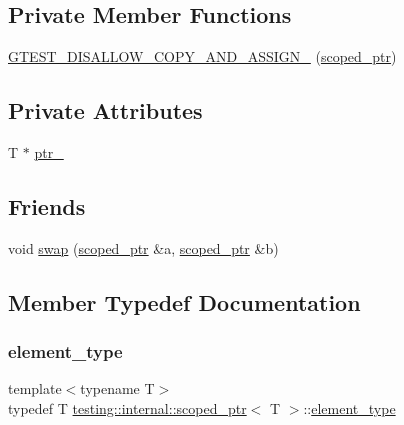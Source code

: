 \subsection*{Private Member Functions}
\begin{DoxyCompactItemize}
\item 
\mbox{\hyperlink{classtesting_1_1internal_1_1scoped__ptr_aa905e98e04e868208e9fb850b93d58f4}{G\+T\+E\+S\+T\+\_\+\+D\+I\+S\+A\+L\+L\+O\+W\+\_\+\+C\+O\+P\+Y\+\_\+\+A\+N\+D\+\_\+\+A\+S\+S\+I\+G\+N\+\_\+}} (\mbox{\hyperlink{classtesting_1_1internal_1_1scoped__ptr}{scoped\+\_\+ptr}})
\end{DoxyCompactItemize}
\subsection*{Private Attributes}
\begin{DoxyCompactItemize}
\item 
T $\ast$ \mbox{\hyperlink{classtesting_1_1internal_1_1scoped__ptr_ab69d9f1f216ae91f8b8abca63e797397}{ptr\+\_\+}}
\end{DoxyCompactItemize}
\subsection*{Friends}
\begin{DoxyCompactItemize}
\item 
void \mbox{\hyperlink{classtesting_1_1internal_1_1scoped__ptr_a01bc0441e6a3ebf26807ac523392ca86}{swap}} (\mbox{\hyperlink{classtesting_1_1internal_1_1scoped__ptr}{scoped\+\_\+ptr}} \&a, \mbox{\hyperlink{classtesting_1_1internal_1_1scoped__ptr}{scoped\+\_\+ptr}} \&b)
\end{DoxyCompactItemize}


\subsection{Member Typedef Documentation}
\mbox{\label{classtesting_1_1internal_1_1scoped__ptr_ae755ffeebada8e20b68c1d1ffa91cf13}} 
\subsubsection{\texorpdfstring{element\_type}{element\_type}}
{\footnotesize\ttfamily template$<$typename T$>$ \\
typedef T \mbox{\hyperlink{classtesting_1_1internal_1_1scoped__ptr}{testing\+::internal\+::scoped\+\_\+ptr}}$<$ T $>$\+::\mbox{\hyperlink{classtesting_1_1internal_1_1scoped__ptr_ae755ffeebada8e20b68c1d1ffa91cf13}{element\+\_\+type}}}



